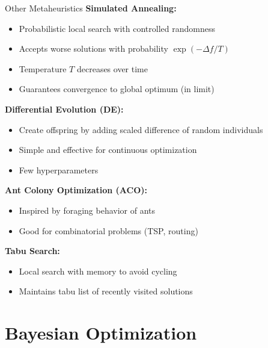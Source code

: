 \documentclass[aspectratio=169]{beamer}
\begin{document}
\begin{frame}{Other Metaheuristics}
  \textbf{Simulated Annealing:}
  \begin{itemize}
    \item Probabilistic local search with controlled randomness
    \item Accepts worse solutions with probability $\exp(-\Delta f / T)$
    \item Temperature $T$ decreases over time
    \item Guarantees convergence to global optimum (in limit)
  \end{itemize}

  \vspace{0.5em}

  \textbf{Differential Evolution (DE):}
  \begin{itemize}
    \item Create offspring by adding scaled difference of random individuals
    \item Simple and effective for continuous optimization
    \item Few hyperparameters
  \end{itemize}

  \vspace{0.5em}

  \textbf{Ant Colony Optimization (ACO):}
  \begin{itemize}
    \item Inspired by foraging behavior of ants
    \item Good for combinatorial problems (TSP, routing)
  \end{itemize}

  \vspace{0.5em}

  \textbf{Tabu Search:}
  \begin{itemize}
    \item Local search with memory to avoid cycling
    \item Maintains tabu list of recently visited solutions
  \end{itemize}
\end{frame}

\section{Bayesian Optimization}
\end{document}
